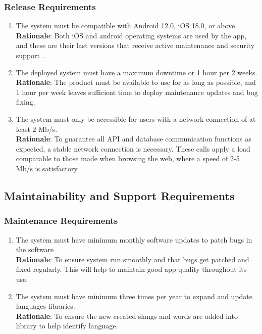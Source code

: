 \subsubsection{Release Requirements}
\label{ssub:release_requirements}
\begin{enumerate}[{OE-R}1. ]
	\item The system must be compatible with Android 12.0, iOS 18.0, or above.
	\\ \textbf{Rationale}: Both iOS and android operating systems are used by the app, and these are their last versions that receive active maintenance and security support \cite{8,9}. 
	\item The deployed system must have a maximum downtime or 1 hour per 2 weeks.
	\\ \textbf{Rationale}: The product must be available to use for as long as possible, and 1 hour per week leaves sufficient time to deploy maintenance updates and bug fixing.
	\item The system must only be accessible for users with a network connection of at least 2 Mb/s.
	\\ \textbf{Rationale}: To guarantee all API and database communication functions as expected, a stable network connection is necessary. These calls apply a load comparable to those made when browsing the web, where a speed of 2-5 Mb/s is satisfactory \cite{10}.
\end{enumerate}


\subsection{Maintainability and Support Requirements}
\label{sub:maintainability_and_support_requirements}

\subsubsection{Maintenance Requirements}
\label{ssub:maintenance_requirements}
\begin{enumerate}[{MS-M}1. ]
	\item The system must have minimum monthly software updates to patch bugs in the software  
	\\ \textbf{Rationale}: To ensure system 	run smoothly and that bugs get patched and fixed regularly. This will help to maintain 	good app quality throughout its use.
	\item The system must have minimum three times per year to expand and update languages libraries. 
	\\ \textbf{Rationale}: To ensure the new created slangs and words are added into library to help identify language.
\end{enumerate}

